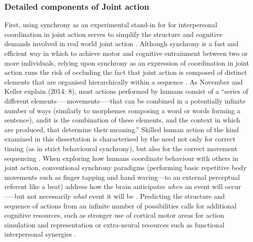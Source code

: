 \begin{CJK}{UTF8}{gbsn}
\subsubsection{Detailed components of Joint action\label{sect:structureJA}}
First, using synchrony as an experimental stand-in for for interpersonal coordination in joint action serves to simplify the structure and cognitive demands involved in real world joint action \citep{Novembre2014}. Although synchrony is a fast and efficient way in which to achieve motor and cognitive entrainment between two or more individuals, relying upon synchrony as an expression of coordination in joint action runs the risk of occluding the fact that joint action is composed of distinct elements that are organised hierarchically within a sequence \citep{Schmidt1975,Rosenbaum2009}.  As November and Keller explain (2014: 8), most actions performed by humans consist of a ``series of different elements—--movements--—that can be combined in a potentially infinite number of ways (similarly to morphemes composing a word or words forming a sentence), and\textellipsis it is the combination of these elements, and the context in which are produced, that determine their meaning.''  Skilled human action of the kind examined in this dissertation is characterised by the need not only for correct timing (as in strict behavioural synchrony), but also for the correct movement sequencing \citep{Palmer2003}.  When exploring how humans coordinate behaviour with others in joint action, conventional synchrony paradigms (performing basic repetitive body movements such as finger tapping and hand waving---to an external perceptual referent like a beat) address how the brain anticipates \textit{when} an event will occur—--but not necessarily \textit{what} event it will be \citep{Novembre2014}.  Predicting the structure and sequence of actions from an infinite number of possibilities calls for additional cognitive resources, such as stronger use of cortical motor areas for action simulation and representation \citep{Bekkering2009} or extra-neural resources such as functional interpersonal synergies \citep{Riley2011}.


\end{CJK}
